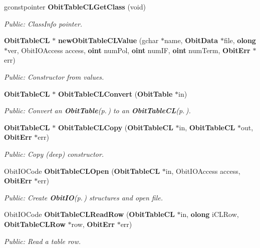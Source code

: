 \begin{CompactItemize}
gconstpointer {\bf Obit\-Table\-CLGet\-Class} (void)
\begin{CompactList}\small\item\em Public: Class\-Info pointer. \item\end{CompactList}\item 
{\bf Obit\-Table\-CL} $\ast$ {\bf new\-Obit\-Table\-CLValue} (gchar $\ast$name, {\bf Obit\-Data} $\ast$file, {\bf olong} $\ast$ver, Obit\-IOAccess access, {\bf oint} num\-Pol, {\bf oint} num\-IF, {\bf oint} num\-Term, {\bf Obit\-Err} $\ast$err)
\begin{CompactList}\small\item\em Public: Constructor from values. \item\end{CompactList}\item 
{\bf Obit\-Table\-CL} $\ast$ {\bf Obit\-Table\-CLConvert} ({\bf Obit\-Table} $\ast$in)
\begin{CompactList}\small\item\em Public: Convert an {\bf Obit\-Table}{\rm (p.\,\pageref{structObitTable})} to an {\bf Obit\-Table\-CL}{\rm (p.\,\pageref{structObitTableCL})}. \item\end{CompactList}\item 
{\bf Obit\-Table\-CL} $\ast$ {\bf Obit\-Table\-CLCopy} ({\bf Obit\-Table\-CL} $\ast$in, {\bf Obit\-Table\-CL} $\ast$out, {\bf Obit\-Err} $\ast$err)
\begin{CompactList}\small\item\em Public: Copy (deep) constructor. \item\end{CompactList}\item 
Obit\-IOCode {\bf Obit\-Table\-CLOpen} ({\bf Obit\-Table\-CL} $\ast$in, Obit\-IOAccess access, {\bf Obit\-Err} $\ast$err)
\begin{CompactList}\small\item\em Public: Create {\bf Obit\-IO}{\rm (p.\,\pageref{structObitIO})} structures and open file. \item\end{CompactList}\item 
Obit\-IOCode {\bf Obit\-Table\-CLRead\-Row} ({\bf Obit\-Table\-CL} $\ast$in, {\bf olong} i\-CLRow, {\bf Obit\-Table\-CLRow} $\ast$row, {\bf Obit\-Err} $\ast$err)
\begin{CompactList}\small\item\em Public: Read a table row. \item\end{CompactList}\item 

\end{CompactItemize}
